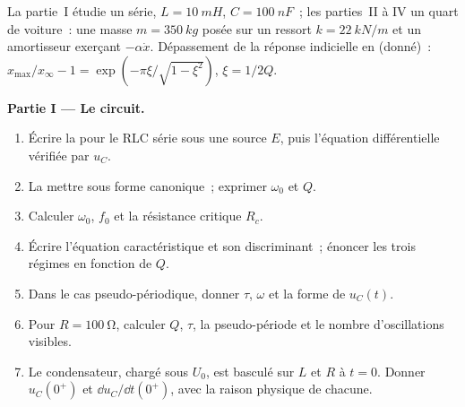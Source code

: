 \begin{problem}
\label{pb:b1:transient-regimes:1}
La partie~I étudie un  série, $L = \qty{10}{mH}$, $C = \qty{100}{nF}$~;
les parties~II à IV un quart de voiture~: une masse $m = \qty{350}{kg}$
posée sur un ressort $k = \qty{22}{kN/m}$ et un amortisseur exerçant
$-\alpha\dot x$. Dépassement de la réponse indicielle en  (donné)~:
$x_{\max}/x_\infty - 1 = \exp(-\pi\xi/\sqrt{1 - \xi^2})$, $\xi = 1/2Q$.

\medskip
\noindent\textbf{Partie I --- Le circuit.}
\begin{enumerate}
  \item Écrire la  pour le RLC série sous une source $E$,
        puis l'équation différentielle vérifiée par $u_C$.
  \item La mettre sous forme canonique~; exprimer $\omega_0$ et $Q$.
  \item Calculer $\omega_0$, $f_0$ et la résistance critique $R_c$.
  \item Écrire l'équation caractéristique et son discriminant~; énoncer
        les trois régimes en fonction de $Q$.
  \item Dans le cas pseudo-périodique, donner $\tau$, $\omega$ et la
        forme de $u_C(t)$.
  \item Pour $R = \qty{100}{\ohm}$, calculer $Q$, $\tau$, la
        pseudo-période et le nombre d'oscillations visibles.
  \item Le condensateur, chargé sous $U_0$, est basculé sur $L$ et $R$ à
        $t = 0$. Donner $u_C(0^+)$ et $\dd u_C/\dd t(0^+)$, avec la
        raison physique de chacune.
\end{enumerate}


\end{problem}
